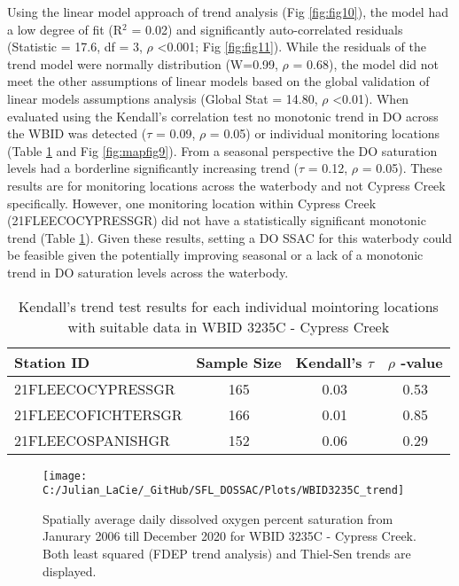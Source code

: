 \documentclass[]{interact}
\theoremstyle{plain}%
\theoremstyle{definition}
\theoremstyle{remark}
\begin{document}
Using the linear model approach of trend analysis (Fig \ref{fig:fig10}),
the model had a low degree of fit (R\(^{2}\) = 0.02) and significantly
auto-correlated residuals (Statistic = 17.6, df = 3, \(\rho\)
\textless0.001; Fig \ref{fig:fig11}). While the residuals of the trend
model were normally distribution (W=0.99, \(\rho\) = 0.68), the model
did not meet the other assumptions of linear models based on the global
validation of linear models assumptions analysis (Global Stat = 14.80,
\(\rho\) \textless0.01). When evaluated using the Kendall's correlation
test no monotonic trend in DO across the WBID was detected (\(\tau\) =
0.09, \(\rho\) = 0.05) or individual monitoring locations (Table
\ref{tab:trendtab9} and Fig \ref{fig:mapfig9}). From a seasonal
perspective the DO saturation levels had a borderline significantly
increasing trend (\(\tau\) = 0.12, \(\rho\) = 0.05). These results are
for monitoring locations across the waterbody and not Cypress Creek
specifically. However, one monitoring location within Cypress Creek
(21FLEECOCYPRESSGR) did not have a statistically significant monotonic
trend (Table \ref{tab:trendtab9}). Given these results, setting a DO
SSAC for this waterbody could be feasible given the potentially
improving seasonal or a lack of a monotonic trend in DO saturation
levels across the waterbody.

\begin{table}[H]

\caption{\label{tab:unnamed-chunk-17}\label{tab:trendtab9} Kendall's trend test results for each individual mointoring locations with suitable data in WBID 3235C - Cypress Creek}
\centering
\fontsize{10}{12}\selectfont
\begin{tabular}[t]{lccc}
\toprule
Station ID & Sample Size & Kendall's $\tau$ & $\rho$ -value\\
\midrule
21FLEECOCYPRESSGR & 165 & 0.03 & 0.53\\
21FLEECOFICHTERSGR & 166 & 0.01 & 0.85\\
21FLEECOSPANISHGR & 152 & 0.06 & 0.29\\
\bottomrule
\end{tabular}
\end{table}

\begin{figure}[H]

{\centering \texttt{[image: C:/Julian\_LaCie/\_GitHub/SFL\_DOSSAC/Plots/WBID3235C\_trend]} 

}

\caption{\label{fig:fig10} Spatially average daily dissolved oxygen percent saturation from Janurary 2006 till December 2020 for  WBID 3235C - Cypress Creek. Both least squared (FDEP trend analysis) and Thiel-Sen trends are displayed.}\label{fig:unnamed-chunk-18}
\end{figure}
\end{document}
